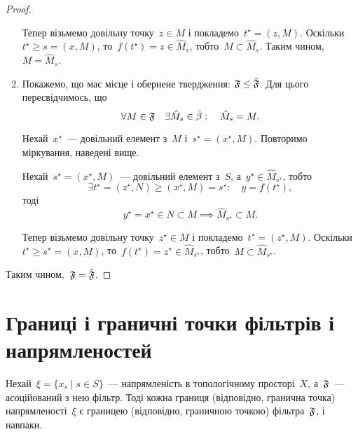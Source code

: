 \begin{proof}
\begin{enumerate}
        Тепер візьмемо довільну точку~$z \in M$ і покладемо~$t^\star = (z, M)$. Оскільки~$t^\star \ge s = (x, M)$, то~$f(t^\star) = z \in \hat M_s$, тобто~$M \subset \hat M_s$. Таким чином,~$M = \hat M_s$.

        \item Покажемо, що має місце і обернене твердження: $\frak F \le \hat{\frak F}$. Для цього пересвідчимось, що
        \begin{equation*}
            \forall M \in \frak F \quad
            \exists \hat M_s \in \hat \beta: \quad
            \hat M_s = M.
        \end{equation*}

        Нехай~$x^\star$~--- довільний елемент з~$M$ і~$s^\star = (x^\star, M)$. Повторимо міркування, наведені вище. 

        Нехай~$s^\star = (x^\star, M)$~--- довільний елемент з~$S$, а~$y^\star \in \hat M_{s^\star}$, тобто
        \begin{equation*}
            \exists t^\star = (z^\star, N) \ge (x^\star, M) = s^\star: \quad y = f(t^\star),
        \end{equation*}
        тоді
        \begin{equation*}
            y^\star = x^\star \in N \subset M \implies \hat M_{s^\star} \subset M.
        \end{equation*}

        Тепер візьмемо довільну точку~$z^\star \in M$ і покладемо~$t^\star = (z^\star, M)$. Оскільки~$t^\star \ge s^\star = (x, M)$, то~$f(t^\star) = z^\star \in \hat M_{s^\star}$, тобто~$M \subset \hat M_{s^\star}$.
    \end{enumerate}
    
    Таким чином,~$\frak F = \hat{\frak F}$.
\end{proof}

\section{Границі і граничні точки фільтрів і напрямленостей}

\begin{theorem}
    Нехай~$\xi = \{x_s \mid s \in S\}$~--- напрямленість в топологічному просторі~$X$, а~$\frak F$~--- асоційований з нею фільтр. Тоді кожна границя (відповідно, гранична точка) напрямленості~$\xi$ є границею (відповідно, граничною точкою) фільтра~$\frak F$, і навпаки.
\end{theorem}

